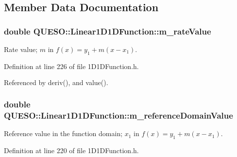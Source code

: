 \subsection{Member Data Documentation}
\hypertarget{class_q_u_e_s_o_1_1_linear1_d1_d_function_aa593d204ade4bf240d0353eaf9f10fd0}{
\subsubsection[{m\-\_\-rate\-Value}]{\setlength{\rightskip}{0pt plus 5cm}double Q\-U\-E\-S\-O\-::\-Linear1\-D1\-D\-Function\-::m\-\_\-rate\-Value\hspace{0.3cm}{\ttfamily [protected]}}}\label{class_q_u_e_s_o_1_1_linear1_d1_d_function_aa593d204ade4bf240d0353eaf9f10fd0}


Rate value; $ m$ in $f(x) = y_1 + m (x - x_1)$. 



Definition at line 226 of file 1\-D1\-D\-Function.\-h.



Referenced by deriv(), and value().

\hypertarget{class_q_u_e_s_o_1_1_linear1_d1_d_function_a9ff67ad29df205d2c78e3431b062ccb2}{
\subsubsection[{m\-\_\-reference\-Domain\-Value}]{\setlength{\rightskip}{0pt plus 5cm}double Q\-U\-E\-S\-O\-::\-Linear1\-D1\-D\-Function\-::m\-\_\-reference\-Domain\-Value\hspace{0.3cm}{\ttfamily [protected]}}}\label{class_q_u_e_s_o_1_1_linear1_d1_d_function_a9ff67ad29df205d2c78e3431b062ccb2}


Reference value in the function domain; $ x_1 $ in $ f(x) = y_1 + m (x - x_1)$. 



Definition at line 220 of file 1\-D1\-D\-Function.\-h.



